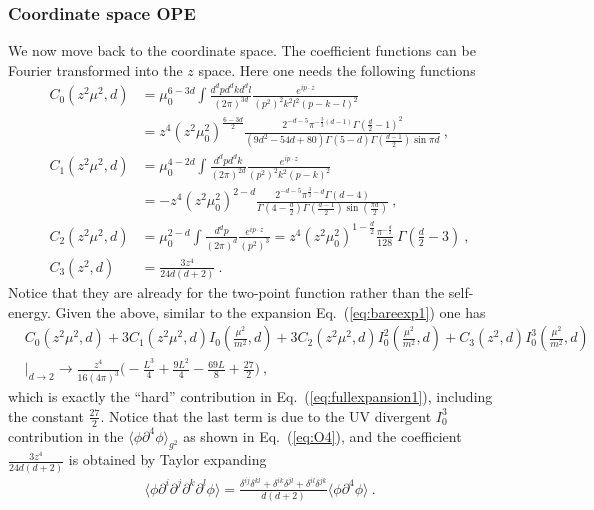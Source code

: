 \documentclass[a4paper,11pt]{article}
\begin{document}
\subsubsection{Coordinate space OPE}
We now move back to the coordinate space. The coefficient functions can be Fourier transformed into the $z$ space. Here one needs the following functions
\begin{align}
C_0(z^2\mu^2,d)&= \mu_0^{6-3d}\int \frac{d^dpd^dkd^dl}{(2\pi)^{3d}}\frac{e^{ip\cdot z}}{(p^2)^2k^2l^2(p-k-l)^2}\nonumber \\ 
&=z^4(z^2\mu_0^2)^{\frac{6-3d}{2}}\frac{2^{-d-5} \pi ^{-\frac{3}{2}(d-1)}  \Gamma \left(\frac{d}{2}-1\right)^2}{(9d^2-54d+80) \Gamma (5-d) \Gamma \left(\frac{d-1}{2}\right)\sin \pi d} \ , \\ 
C_1(z^2\mu^2,d)&=\mu_0^{4-2d}\int \frac{d^dpd^dk}{(2\pi)^{2d}}\frac{e^{ip\cdot z}}{(p^2)^2k^2(p-k)^2}\nonumber \\ 
&=-z^4(z^2\mu_0^2)^{2-d}\frac{2^{-d-5} \pi ^{\frac{3}{2}-d}   \Gamma (d-4)}{\Gamma \left(4-\frac{d}{2}\right) \Gamma \left(\frac{d-1}{2}\right)\sin\left(\frac{\pi  d}{2}\right)} \ , \\
C_2(z^2\mu^2,d)&=\mu_0^{2-d}\int \frac{d^dp}{(2\pi)^d}\frac{e^{ip\cdot z}}{(p^2)^3}=z^4(z^2\mu_0^2)^{1-\frac{d}{2}}\frac{\pi ^{-\frac{d}{2}} }{128} \ \Gamma \left(\frac{d}{2}-3\right) \ , \\ 
C_3(z^2,d)&=\frac{3z^4}{24d(d+2)} \ .
\end{align}
Notice that they are already for the two-point function rather than the self-energy. 
Given the above, similar to the expansion Eq.~(\ref{eq:bareexp1}) one has
\begin{align}
&C_0(z^2\mu^2,d)+3C_1(z^2\mu^2,d)I_0\left(\frac{\mu^2}{m^2},d\right)+3C_2(z^2\mu^2,d)I_0^2\left(\frac{\mu^2}{m^2},d\right)+C_3(z^2,d)I_0^3\left(\frac{\mu^2}{m^2},d\right) \nonumber \\ 
&\bigg|_{d\rightarrow2}\rightarrow \frac{z^4}{16(4\pi)^3}\bigg(-\frac{L^3}{4}+\frac{9 L^2}{4}-\frac{69L}{8}+\frac{27}{2}\bigg)  \ , 
\end{align}
which is exactly the ``hard'' contribution in Eq.~(\ref{eq:fullexpansion1}), including the constant $\frac{27}{2}$. Notice that the last term is due to the UV divergent $I_0^3$ contribution in the $\langle \phi\partial^4\phi\rangle_{g^2}$ as shown in Eq.~(\ref{eq:O4}), and the coefficient $\frac{3z^4}{24d(d+2)}$ is obtained by Taylor expanding
\begin{align}
\langle \phi \partial^{i}\partial^j\partial^k\partial^l\phi\rangle=\frac{\delta^{ij}\delta^{kl}+\delta^{ik}\delta^{jl}+\delta^{il}\delta^{jk}}{d(d+2)}\langle \phi \partial^4\phi \rangle \ .
\end{align}
\end{document}
